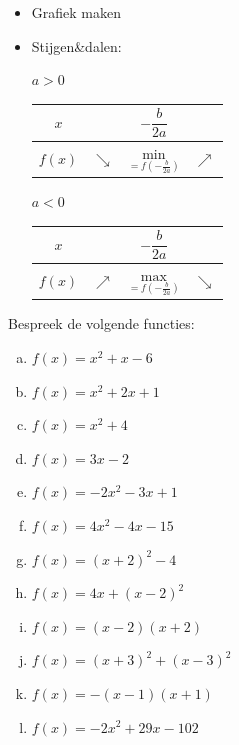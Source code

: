 \documentclass[12pt,twoside,a4paper]{article}
\begin{document}
\begin{mdframed}
\begin{itemize}
  \item Grafiek maken
  \item Stijgen\&dalen:\\
    \begin{minipage}{0.45\textwidth}
      \centering $a>0$\\
      \begin{tabular}{c|lcr}
        $x$ &  & $-\dfrac{b}{2a}$ & \\[0.1cm]
        \hline
        $f(x)$ & $\searrow$ & $\underset{=f(-\frac{b}{2a})}{\mbox{min}}$ & $\nearrow$
      \end{tabular}
    \end{minipage}
    \begin{minipage}{0.45\textwidth}
      \centering $a<0$\\
      \begin{tabular}{c|lcr}
        $x$ &  & $-\dfrac{b}{2a}$ & \\[0.1cm]
        \hline
        $f(x)$ & $\nearrow$ & $\underset{=f(-\frac{b}{2a})}{\mbox{max}}$ & $\searrow$
      \end{tabular}
    \end{minipage}
  \end{itemize}
\end{mdframed}

\begin{oefening}
  Bespreek de volgende functies:
  \begin{multicols}{2}
    \begin{enumerate}[(a)]
      \itemsep.8em
    \item $f(x)=x^2+x-6$
    \item $f(x)=x^2+2x+1$
    \item $f(x)=x^2+4$
    \item $f(x)=3x-2$
    \item $f(x)=-2x^2-3x+1$
    \item $f(x)=4x^2-4x-15$
    \item $f(x)=(x+2)^2-4$
    \item $f(x)=4x+(x-2)^2$
    \item $f(x)=(x-2)(x+2)$
    \item $f(x)=(x+3)^2+(x-3)^2$
    \item $f(x)=-(x-1)(x+1)$
    \item $f(x)=-2x^2+29x-102$
    \end{enumerate}
  \end{multicols}
\end{oefening}
\end{document}
